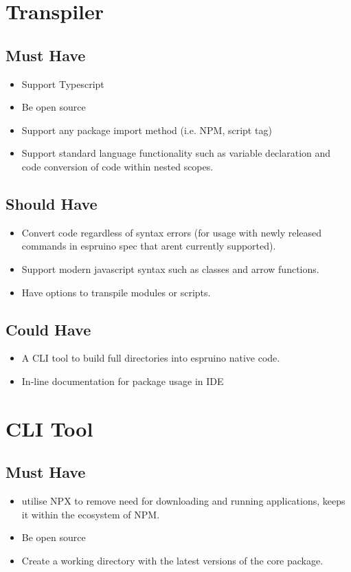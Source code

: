 \documentclass{l4proj}
\begin{document}
\begin{appendices}
\section{Transpiler}
\subsection{Must Have}
\begin{itemize}
    \item Support Typescript
    \item Be open source
    \item Support any package import method (i.e. NPM, script tag)
    \item Support standard language functionality such as variable declaration and code conversion of code within nested scopes.

\end{itemize}
\subsection{Should Have}
\begin{itemize}
    \item Convert code regardless of syntax errors (for usage with newly released commands in espruino spec that arent currently supported).
    \item Support modern javascript syntax such as classes and arrow functions.
    \item Have options to transpile modules or scripts.

\end{itemize}
\subsection{Could Have}
\begin{itemize}
    \item A CLI tool to build full directories into espruino native code.
    \item In-line documentation for package usage in IDE

\end{itemize}


\section{CLI Tool}
\subsection{Must Have}
\begin{itemize}
    \item utilise NPX to remove need for downloading and running applications, keeps it within the ecosystem of NPM.
    \item Be open source
    \item Create a working directory with the latest versions of the core package.


\end{itemize}
\end{appendices}
\end{document}
